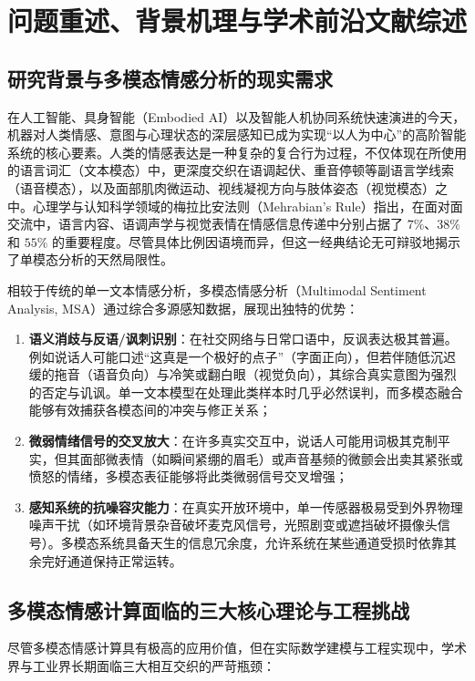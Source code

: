 \section{问题重述、背景机理与学术前沿文献综述}

\subsection{研究背景与多模态情感分析的现实需求}
在人工智能、具身智能（Embodied AI）以及智能人机协同系统快速演进的今天，机器对人类情感、意图与心理状态的深层感知已成为实现“以人为中心”的高阶智能系统的核心要素。人类的情感表达是一种复杂的复合行为过程，不仅体现在所使用的语言词汇（文本模态）中，更深度交织在语调起伏、重音停顿等副语言学线索（语音模态），以及面部肌肉微运动、视线凝视方向与肢体姿态（视觉模态）之中。心理学与认知科学领域的梅拉比安法则（Mehrabian's Rule）指出，在面对面交流中，语言内容、语调声学与视觉表情在情感信息传递中分别占据了 $7\%$、$38\%$ 和 $55\%$ 的重要程度。尽管具体比例因语境而异，但这一经典结论无可辩驳地揭示了单模态分析的天然局限性。

相较于传统的单一文本情感分析，多模态情感分析（Multimodal Sentiment Analysis, MSA）通过综合多源感知数据，展现出独特的优势：
\begin{enumerate}
    \item \textbf{语义消歧与反语/讽刺识别}：在社交网络与日常口语中，反讽表达极其普遍。例如说话人可能口述“这真是一个极好的点子”（字面正向），但若伴随低沉迟缓的拖音（语音负向）与冷笑或翻白眼（视觉负向），其综合真实意图为强烈的否定与讥讽。单一文本模型在处理此类样本时几乎必然误判，而多模态融合能够有效捕获各模态间的冲突与修正关系；
    \item \textbf{微弱情绪信号的交叉放大}：在许多真实交互中，说话人可能用词极其克制平实，但其面部微表情（如瞬间紧绷的眉毛）或声音基频的微颤会出卖其紧张或愤怒的情绪，多模态表征能够将此类微弱信号交叉增强；
    \item \textbf{感知系统的抗噪容灾能力}：在真实开放环境中，单一传感器极易受到外界物理噪声干扰（如环境背景杂音破坏麦克风信号，光照剧变或遮挡破坏摄像头信号）。多模态系统具备天生的信息冗余度，允许系统在某些通道受损时依靠其余完好通道保持正常运转。
\end{enumerate}

\subsection{多模态情感计算面临的三大核心理论与工程挑战}
尽管多模态情感计算具有极高的应用价值，但在实际数学建模与工程实现中，学术界与工业界长期面临三大相互交织的严苛瓶颈：

